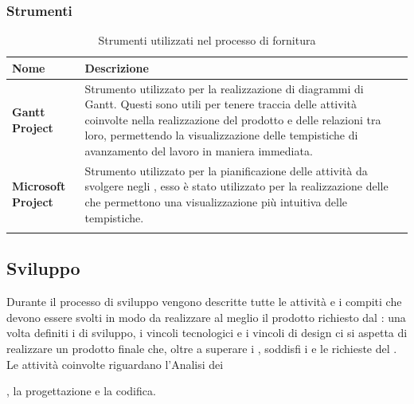 \subsubsection{Strumenti}

\setlength{\freewidth}{\dimexpr\textwidth-0\tabcolsep}
	\renewcommand{\arraystretch}{1.5}
	\setlength{\aboverulesep}{0pt}
	\setlength{\belowrulesep}{0pt}
	\begin{longtable}{L{.210\freewidth} L{.6\freewidth} L{.080\freewidth}}
		\textbf{Nome} & \textbf{Descrizione} \\
		\toprule
		\endhead		
		\textbf{Gantt Project} & Strumento utilizzato per la realizzazione di  diagrammi di Gantt. Questi sono utili per tenere traccia delle attività coinvolte nella realizzazione del prodotto e delle relazioni tra loro, permettendo la visualizzazione delle tempistiche di avanzamento del lavoro in maniera immediata. \\
		\textbf{Microsoft Project} & Strumento utilizzato per la pianificazione delle attività da svolgere negli , esso è stato utilizzato per la realizzazione delle  che permettono una visualizzazione più intuitiva delle tempistiche. \\
		\bottomrule
		\hiderowcolors
		\caption{Strumenti utilizzati nel processo di fornitura}
	\end{longtable}


\subsection{Sviluppo}
Durante il processo di sviluppo vengono descritte tutte le attività e i compiti che devono essere svolti in modo da realizzare al meglio il prodotto richiesto dal : una volta definiti i  di sviluppo, i vincoli tecnologici e i vincoli di design ci si aspetta di realizzare un prodotto finale che, oltre a superare i , soddisfi i  e le richieste del . Le attività coinvolte riguardano l'Analisi dei , la progettazione e la codifica.
